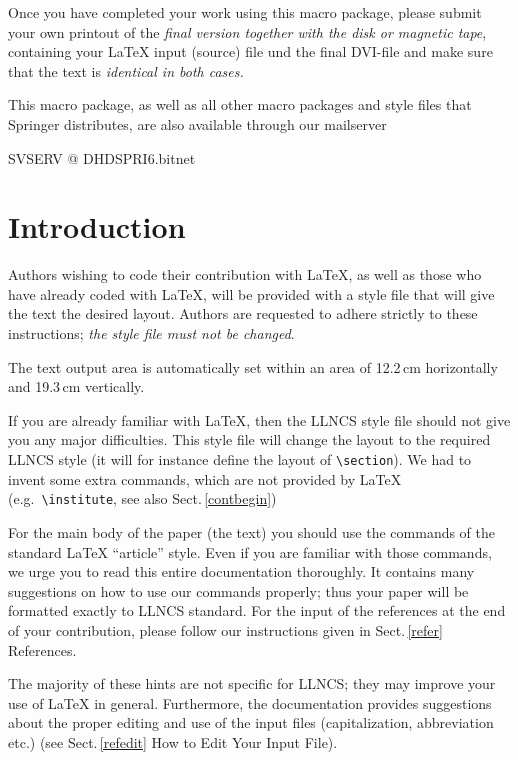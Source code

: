 Once you have completed your work using this macro package,
please submit your own printout of the {\it final
version together with the disk or magnetic tape}, containing your
\LaTeX{} input (source) file und the final DVI-file and make sure
that the text is {\it identical in both cases.}

\bigskip
This macro package, as well as all other macro packages and style
files that Springer distributes, are also available through our
mailserver

SVSERV @ DHDSPRI6.bitnet
%
\newpage
\tableofcontents
\newpage
%
\section{Introduction}
%
Authors wishing to code their contribution
with \LaTeX{}, as well as those who have already coded with \LaTeX{},
will be provided with a style file that will give the text the
desired layout. Authors are requested to
adhere strictly to these instructions; {\it the style
file must not be changed}.

The text output area is automatically set within an area of
12.2\,cm horizontally  and 19.3\,cm vertically.

If you are already familiar with \LaTeX{}, then the
LLNCS style file should not give you any major difficulties.
This style file will change the layout to the required LLNCS style
(it will for instance  define the layout of \verb|\section|).
We had to invent some extra commands,
which are not provided by \LaTeX{} (e.g.\
\verb|\institute|, see also Sect.\,\ref{contbegin})

For the main body of the paper (the text) you
should use the commands of the standard \LaTeX{} ``article'' style.
Even if you are familiar with those commands, we urge you to read
this entire documentation thoroughly. It contains many suggestions on
how to use our commands properly; thus  your paper
will be formatted exactly to LLNCS standard.
For the input of the references at the end of your contribution,
please follow our instructions given in Sect.\,\ref{refer} References.

The majority of these hints are not specific for LLNCS; they may improve
your use of \LaTeX{} in general.
Furthermore, the documentation provides suggestions about the proper
editing and use
of the input files (capitalization, abbreviation etc.) (see
Sect.\,\ref{refedit} How to Edit Your Input File).
%
